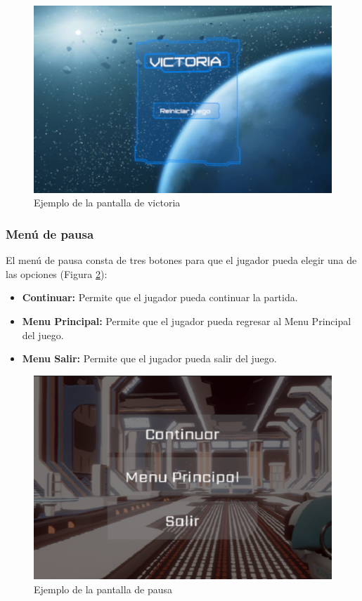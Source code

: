 \begin{figure}[H]
	\centering
	\includegraphics[scale=0.85]{imagenes/MenuVictoria3D.png}
	\caption{\label{fig:MenuVictoria3D}Ejemplo de la pantalla de victoria}
\end{figure}

\subsubsection{Menú de pausa}
El menú de pausa consta de tres botones para que el jugador pueda elegir una de las opciones (Figura \ref{fig:MenuPausa}):
\begin{itemize}
	\item \textbf{Continuar:} Permite que el jugador pueda continuar la partida.
	\item \textbf{Menu Principal:} Permite que el jugador pueda regresar al Menu Principal del juego.
	\item \textbf{Menu Salir:} Permite que el jugador pueda salir del juego.
\end{itemize}


\begin{figure}[H]
	\centering
	\includegraphics[scale=0.85]{imagenes/MenuPausa.png}
	\caption{\label{fig:MenuPausa}Ejemplo de la pantalla de pausa}
\end{figure}

